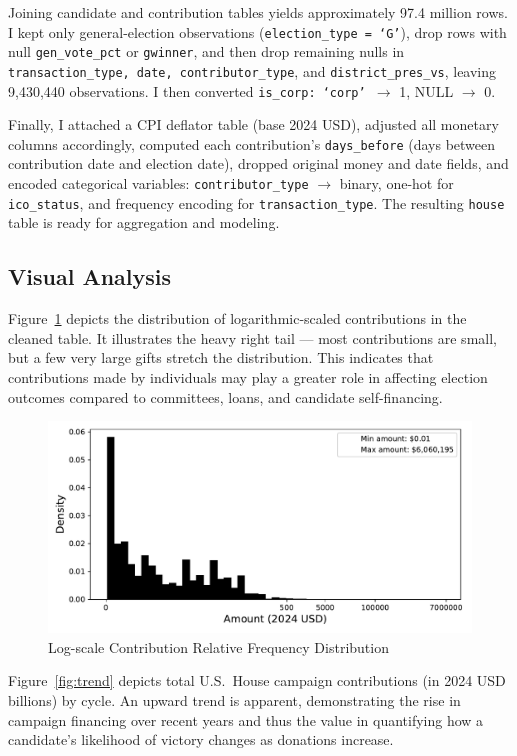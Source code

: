 \indent Joining candidate and contribution tables yields approximately 97.4 million rows. I kept only general-election observations (\texttt{election\_type = `G'}), drop rows with null \texttt{gen\_vote\_pct} or \texttt{gwinner}, and then drop remaining nulls in \texttt{transaction\_type, date, contributor\_type}, and \texttt{district\_pres\_vs}, leaving 9,430,440 observations. I then converted \texttt{is\_corp: `corp' $\xrightarrow{}$} 1, NULL $\xrightarrow{}$ 0.

\indent Finally, I attached a CPI deflator table (base 2024 USD), adjusted all monetary columns accordingly, computed each contribution's \texttt{days\_before} (days between contribution date and election date), dropped original money and date fields, and encoded categorical variables: \texttt{contributor\_type} $\xrightarrow{}$ binary, one-hot for \texttt{ico\_status}, and frequency encoding for \texttt{transaction\_type}. The resulting {\tt house} table is ready for aggregation and modeling.

\subsection*{Visual Analysis}

Figure~\ref{fig:dist} depicts the distribution of logarithmic-scaled contributions in the cleaned table. It illustrates the heavy right tail --- most contributions are small, but a few very large gifts stretch the distribution. This indicates that contributions made by individuals may play a greater role in affecting election outcomes compared to committees, loans, and candidate self-financing.

\begin{figure}[h]
	\centering
	\includegraphics[width = 0.7\linewidth]{../Figures/amount_dist.pdf}
	\caption{Log-scale Contribution Relative Frequency Distribution}
	\label{fig:dist}
\end{figure}

Figure~\ref{fig:trend} depicts total U.S.\ House campaign contributions (in 2024 USD billions) by cycle. An upward trend is apparent, demonstrating the rise in campaign financing over recent years and thus the value in quantifying how a candidate's likelihood of victory changes as donations increase.

